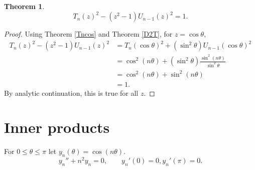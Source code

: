 \documentclass{article}
\theoremstyle{definition}
\newtheorem{theorem}{Theorem}
\theoremstyle{definition}
\begin{document}
\begin{theorem}
\[
T_n(z)^2- (z^2-1)U_{n-1}(z)^2=1.
\]
\label{pell}
\end{theorem}
\begin{proof}
Using Theorem \ref{Tncos} and Theorem \ref{D2T}, for $z=\cos \theta$,
\begin{align*}
T_n(z)^2-(z^2-1)U_{n-1}(z)^2&=
T_n(\cos \theta)^2 + (\sin^2\theta) U_{n-1}(\cos \theta)^2\\
&=\cos^2(n\theta)+(\sin^2 \theta) \frac{\sin^2(n\theta)}{\sin^2\theta}\\
&=\cos^2(n\theta)+\sin^2(n\theta)\\
&=1.
\end{align*}
By analytic continuation, this is true for all $z$. 
\end{proof}







\section{Inner products}
For $0 \leq \theta \leq \pi$ let $y_n(\theta) = \cos(n\theta)$. 
\[
y_n''+n^2y_n=0,\qquad y_n'(0)=0,y_n'(\pi)=0.
\]
\end{document}
